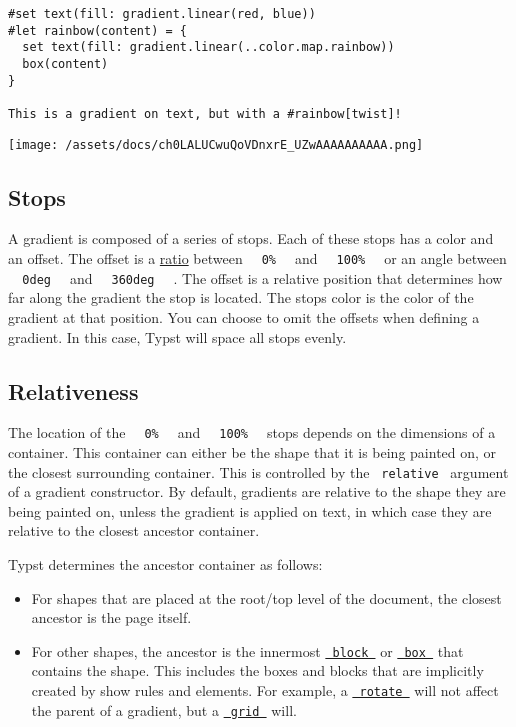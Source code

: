 \begin{verbatim}
#set text(fill: gradient.linear(red, blue))
#let rainbow(content) = {
  set text(fill: gradient.linear(..color.map.rainbow))
  box(content)
}

This is a gradient on text, but with a #rainbow[twist]!
\end{verbatim}

\texttt{[image: /assets/docs/ch0LALUCwuQoVDnxrE\_UZwAAAAAAAAAA.png]}

\subsection{Stops}\label{stops}

A gradient is composed of a series of stops. Each of these stops has a
color and an offset. The offset is a
\href{/docs/reference/layout/ratio/}{ratio} between
\texttt{\ }{\texttt{\ 0\%\ }}\texttt{\ } and
\texttt{\ }{\texttt{\ 100\%\ }}\texttt{\ } or an angle between
\texttt{\ }{\texttt{\ 0deg\ }}\texttt{\ } and
\texttt{\ }{\texttt{\ 360deg\ }}\texttt{\ } . The offset is a relative
position that determines how far along the gradient the stop is located.
The stop\textquotesingle s color is the color of the gradient at that
position. You can choose to omit the offsets when defining a gradient.
In this case, Typst will space all stops evenly.

\subsection{Relativeness}\label{relativeness}

The location of the \texttt{\ }{\texttt{\ 0\%\ }}\texttt{\ } and
\texttt{\ }{\texttt{\ 100\%\ }}\texttt{\ } stops depends on the
dimensions of a container. This container can either be the shape that
it is being painted on, or the closest surrounding container. This is
controlled by the \texttt{\ relative\ } argument of a gradient
constructor. By default, gradients are relative to the shape they are
being painted on, unless the gradient is applied on text, in which case
they are relative to the closest ancestor container.

Typst determines the ancestor container as follows:

\begin{itemize}
\tightlist
\item
  For shapes that are placed at the root/top level of the document, the
  closest ancestor is the page itself.
\item
  For other shapes, the ancestor is the innermost
  \href{/docs/reference/layout/block/}{\texttt{\ block\ }} or
  \href{/docs/reference/layout/box/}{\texttt{\ box\ }} that contains the
  shape. This includes the boxes and blocks that are implicitly created
  by show rules and elements. For example, a
  \href{/docs/reference/layout/rotate/}{\texttt{\ rotate\ }} will not
  affect the parent of a gradient, but a
  \href{/docs/reference/layout/grid/}{\texttt{\ grid\ }} will.
\end{itemize}

